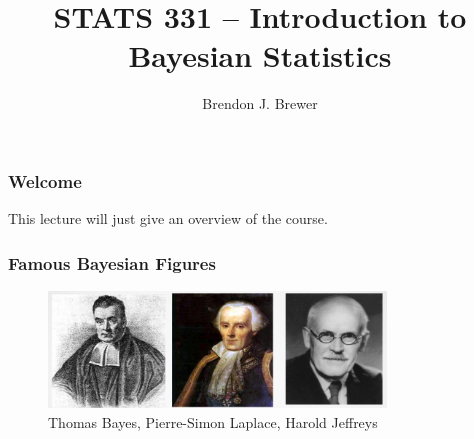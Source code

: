 \documentclass{beamer}
\author{Brendon J. Brewer}
\title{STATS 331 -- Introduction to Bayesian Statistics}
\institute{The University of Auckland}
\date{}
\begin{document}
\frame{\titlepage}

\begin{frame}
\frametitle{Welcome}
This lecture will just give an overview of the course.

\end{frame}


\begin{frame}
\frametitle{Famous Bayesian Figures}

\begin{figure}[!h]
\centering
\includegraphics[width=0.8\textwidth]{images/people.png}
\caption{Thomas Bayes, Pierre-Simon Laplace, Harold Jeffreys
\label{fig:people}}
\end{figure}

\end{frame}
\end{document}
